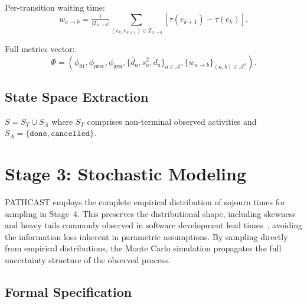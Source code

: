 Per-transition waiting time:
\begin{equation}
\label{eq:waiting-time}
w_{a \to b} = \tfrac{1}{|T_{a \to b}|} \sum_{(e_k, e_{k+1}) \in T_{a \to b}}
    [\tau(e_{k+1}) - \tau(e_k)].
\end{equation}

Full metrics vector:
\begin{equation}
\label{eq:phi}
\Phi = \left( \phi_{\text{fit}}, \phi_{\text{prec}}, \phi_{\text{gen}},
    \{\bar{d}_a, s_a^2, \tilde{d}_a\}_{a \in \mathcal{A}},
    \{w_{a \to b}\}_{(a,b) \in \mathcal{A}^2} \right).
\end{equation}


\subsection{State Space Extraction}
\label{sec:s2-states}

\begin{definition}
\label{def:state-space}
$S = S_T \cup S_A$ where $S_T$ comprises non-terminal observed activities
and $S_A = \{\texttt{done}, \texttt{cancelled}\}$.
\end{definition}


\section{Stage 3: Stochastic Modeling}
\label{sec:stage3}

\begin{remark}
\label{rem:empirical-distributions}
PATHCAST employs the complete empirical distribution of sojourn times for
sampling in Stage~4. This preserves the distributional shape, including
skewness and heavy tails commonly observed in software development lead
times~\cite{little2011factory, flyvbjerg2022empirical}, avoiding the
information loss inherent in parametric assumptions. By sampling directly
from empirical distributions, the Monte Carlo simulation propagates the
full uncertainty structure of the observed process.
\end{remark}

\subsection{Formal Specification}
\label{sec:s3-formal}

